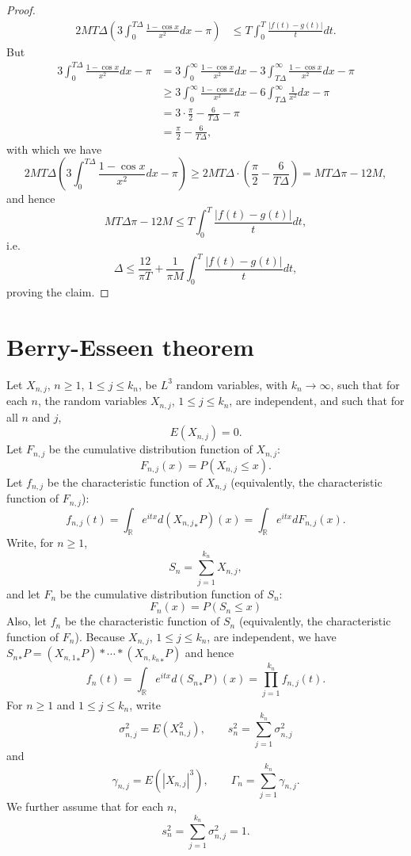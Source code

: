 \documentclass{article}
\theoremstyle{definition}
\theoremstyle{definition}
\begin{document}
\begin{proof}
\begin{align*}
2MT\Delta\left(3\int_0^{T\Delta} \frac{1-\cos x}{x^2} dx - \pi\right)&\leq T \int_0^T \frac{|f(t)-g(t)|}{t} dt.
\end{align*}
But
\begin{align*}
3\int_0^{T\Delta} \frac{1-\cos x}{x^2} dx - \pi &=
3\int_0^\infty \frac{1-\cos x}{x^2} dx - 3 \int_{T\Delta}^\infty \frac{1-\cos x}{x^2} dx - \pi\\
&\geq  3\int_0^\infty \frac{1-\cos x}{x^2} dx  - 6 \int_{T\Delta}^\infty \frac{1}{x^2} dx - \pi\\
&=3\cdot \frac{\pi}{2} - \frac{6}{T\Delta} - \pi\\
&=\frac{\pi}{2}-\frac{6}{T\Delta},
\end{align*}
with which we have
\[
2MT\Delta\left(3\int_0^{T\Delta} \frac{1-\cos x}{x^2} dx - \pi\right) \geq 2MT\Delta \cdot \left(\frac{\pi}{2}-\frac{6}{T\Delta}\right)
=MT\Delta \pi - 12M,
\]
and hence
\[
MT\Delta \pi - 12M \leq T \int_0^T \frac{|f(t)-g(t)|}{t} dt,
\]
i.e. 
\[
\Delta \leq \frac{12}{\pi T} + \frac{1}{\pi M} \int_0^T \frac{|f(t)-g(t)|}{t} dt,
\]
proving the claim.
\end{proof}



\section{Berry-Esseen theorem}
Let $X_{n,j}$, $n \geq 1$, $1 \leq j \leq k_n$, be $L^3$ random variables, with $k_n \to \infty$,
such that for each $n$, the random variables $X_{n,j}$, $1 \leq j \leq k_n$, are independent, and such that
for all $n$ and $j$,
\[
E(X_{n,j})=0.
\]
Let $F_{n,j}$ be the cumulative distribution function of $X_{n,j}$:
\[
F_{n,j}(x) = P(X_{n,j} \leq x).
\]
Let $f_{n,j}$ be the characteristic function of $X_{n,j}$ (equivalently, the characteristic function of $F_{n,j}$):
\[
f_{n,j}(t) = \int_\mathbb{R} e^{itx} d({X_{n,j}}_*P)(x)
=\int_\mathbb{R} e^{itx} dF_{n,j}(x).
\]
Write, for $n \geq 1$,
\[
S_n = \sum_{j=1}^{k_n} X_{n,j},
\]
and let $F_n$ be the cumulative distribution function of $S_n$:
\[
F_n(x) = P(S_n \leq x)
\]
Also, let $f_n$ be the characteristic function of $S_n$ (equivalently, the characteristic function of $F_n$). Because
$X_{n,j}$, $1 \leq j \leq k_n$, are independent, we have ${S_n}_*P=({X_{n,1}}_*P) * \cdots * ({X_{n,k_n}}_*P)$ and hence
\[
f_n(t) = \int_\mathbb{R} e^{itx} d({S_n}_*P)(x)
=\prod_{j=1}^{k_n} f_{n,j}(t).
\]
For $n \geq 1$ and $1 \leq j \leq k_n$, write
\[
\sigma_{n,j}^2 = E(X_{n,j}^2), \qquad s_n^2 = \sum_{j=1}^{k_n} \sigma_{n,j}^2
\]
and
\[
\gamma_{n,j} = E(|X_{n,j}|^3), \qquad \Gamma_n = \sum_{j=1}^{k_n} \gamma_{n,j}.
\]
We further assume that for each $n$,
\begin{equation}
s_n^2 = \sum_{j=1}^{k_n} \sigma_{n,j}^2 = 1.
\label{sn}
\end{equation}
\end{document}
